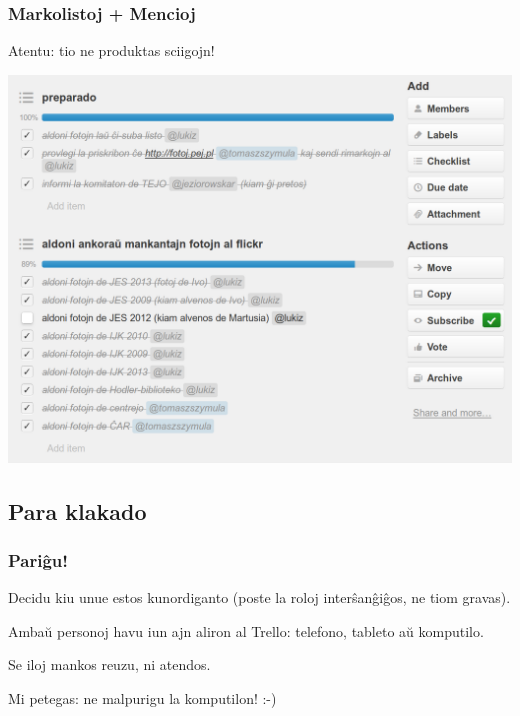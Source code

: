   \begin{frame}
    \frametitle{Markolistoj + Mencioj}
    
	\begin{center}
    	Atentu: \alert{tio ne produktas sciigojn!}
	\end{center}
		
	\begin{center}
		\includegraphics[scale=0.175]{ekranoj/markolistoj-kun-mencioj}
	\end{center}
	
  \end{frame}


\subsection{Para klakado}
  \begin{frame}
    \frametitle{Pariĝu!}
    Decidu kiu unue estos kunordiganto (poste la roloj interŝanĝiĝos, ne tiom gravas).
    
    Ambaŭ personoj havu iun ajn aliron al Trello: telefono, tableto aŭ komputilo.
    
    Se iloj mankos reuzu, ni atendos.
    
    Mi petegas: ne malpurigu la komputilon! :-)
    
  \end{frame}

